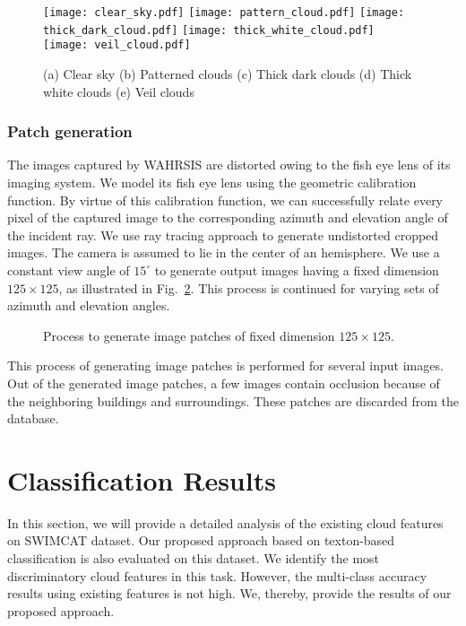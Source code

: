\begin{figure}[htbp]
\centering
\texttt{[image: clear\_sky.pdf]}
\texttt{[image: pattern\_cloud.pdf]}
\texttt{[image: thick\_dark\_cloud.pdf]}
\texttt{[image: thick\_white\_cloud.pdf]}
\texttt{[image: veil\_cloud.pdf]}
\caption[Various cloud classes of SWIMCAT database.]{(a) Clear sky (b) Patterned clouds (c) Thick dark clouds (d) Thick white clouds (e) Veil clouds}
\label{fig:cloud_classes}
\end{figure}

\subsubsection{Patch generation}
The images captured by WAHRSIS are distorted owing to the fish eye lens of its imaging system. We model its fish eye lens using the geometric calibration function. By virtue of this calibration function, we can successfully relate every pixel of the captured image to the corresponding azimuth and elevation angle of the incident ray. We use ray tracing approach to generate undistorted cropped images. The camera is assumed to lie in the center of an hemisphere. We use a constant view angle of $15^{\circ}$ to generate output images having a fixed dimension $125 \times 125$, as illustrated in Fig.~\ref{fig:chap6-undistortion-results}. This process is continued for varying sets of azimuth and elevation angles. 


\begin{figure}[htbp]
\centering   
{}\hspace{1em}
\caption{Process to generate image patches of fixed dimension $125 \times 125$.}
\label{fig:chap6-undistortion-results}
\end{figure}

This process of generating image patches is performed for several input images. Out of the generated image patches, a few images contain occlusion because of the neighboring buildings and surroundings. These patches are discarded from the database. 



\section{Classification Results}
\label{sec:chap6-results}
In this section, we will provide a detailed analysis of the existing cloud features on SWIMCAT dataset. Our proposed approach based on texton-based classification is also evaluated on this dataset. We identify the most discriminatory cloud features in this task. However, the multi-class accuracy results using existing features is not high. We, thereby, provide the results of our proposed approach.

